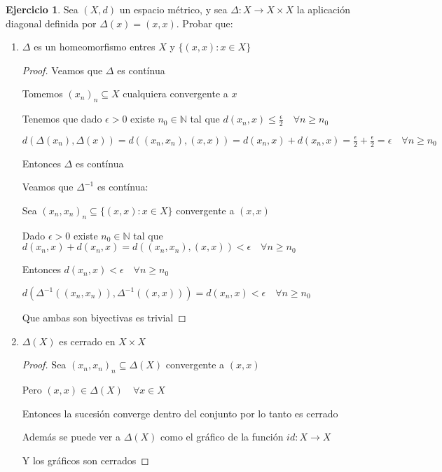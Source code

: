 \documentclass[11pt]{report}
\newcommand{\N}{\mathbb{N}}
\newcommand{\ra}{\rightarrow}
\theoremstyle{definition}
\newtheorem{ej}{Ejercicio}
\begin{document}
	\begin{ej}
		Sea $(X,d)$ un espacio métrico, y sea $\Delta : X \ra X \times X$ la aplicación diagonal definida por $\Delta (x) = (x,x)$. Probar que:
		\begin{enumerate}
			\item $\Delta$ es un homeomorfismo entres $X$ y $\{(x,x):x\in X\}$
				\begin{proof}
					Veamos que $\Delta$ es contínua

					Tomemos $(x_n)_n \subseteq X$ cualquiera convergente a $x$ 

					Tenemos que dado $\epsilon >0$ existe $n_0 \in \N$ tal que $d(x_n,x) \leq \frac{\epsilon}{2}\quad \forall n \geq n_0$

					$d(\Delta (x_n),\Delta (x)) = d((x_n,x_n),(x,x)) = d(x_n,x) + d(x_n,x) = \frac{\epsilon}{2} + \frac{\epsilon}{2} = \epsilon \quad \forall n \geq n_0$  

					Entonces $\Delta$ es contínua

					Veamos que $\Delta^{-1}$ es contínua:

					Sea $(x_n,x_n)_n \subseteq \{(x,x):x\in X\}$ convergente a $(x,x)$

					Dado $\epsilon >0$ existe $n_0 \in \N$ tal que $d(x_n,x) + d(x_n,x) = d((x_n,x_n),(x,x)) < \epsilon \quad \forall n \geq n_0$ 

					Entonces $d(x_n,x) < \epsilon \quad \forall n \geq n_0$

					$d(\Delta^{-1}((x_n,x_n)),\Delta^{-1}((x,x))) = d(x_n,x) < \epsilon \quad \forall n \geq n_0$

					Que ambas son biyectivas es trivial
				\end{proof}
				
			\item $\Delta(X)$ es cerrado en $X \times X$	
				\begin{proof}
					Sea $(x_n,x_n)_n \subseteq \Delta (X)$ convergente a $(x,x)$

					Pero $(x,x) \in \Delta (X) \quad \forall x \in X$

					Entonces la sucesión converge dentro del conjunto por lo tanto es cerrado

					Además se puede ver a $\Delta (X)$ como el gráfico de la función $id : X \ra X$

					Y los gráficos son cerrados
				\end{proof}
		\end{enumerate}
	\end{ej}
	
\end{document}
